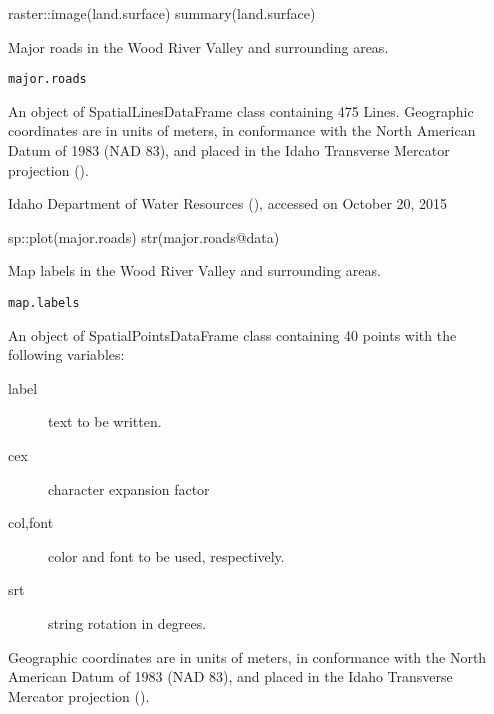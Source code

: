 \documentclass[a4paper]{book}
\begin{document}
%
\begin{Examples}
\begin{ExampleCode}
raster::image(land.surface)
summary(land.surface)

\end{ExampleCode}
\end{Examples}
%
\begin{Description}\relax
Major roads in the Wood River Valley and surrounding areas.
\end{Description}
%
\begin{Usage}
\begin{verbatim}
major.roads
\end{verbatim}
\end{Usage}
%
\begin{Format}
An object of SpatialLinesDataFrame class containing 475 Lines.
Geographic coordinates are in units of meters, in conformance with the
North American Datum of 1983 (NAD 83), and placed in the
Idaho Transverse Mercator projection ().
\end{Format}
%
\begin{Source}\relax
Idaho Department of Water Resources
(),
accessed on October 20, 2015
\end{Source}
%
\begin{Examples}
\begin{ExampleCode}
sp::plot(major.roads)
str(major.roads@data)

\end{ExampleCode}
\end{Examples}
%
\begin{Description}\relax
Map labels in the Wood River Valley and surrounding areas.
\end{Description}
%
\begin{Usage}
\begin{verbatim}
map.labels
\end{verbatim}
\end{Usage}
%
\begin{Format}
An object of SpatialPointsDataFrame class containing
40 points with the following variables:
\begin{description}

\item[label] text to be written.
\item[cex] character expansion factor
\item[col,font] color and font to be used, respectively.
\item[srt] string rotation in degrees.

\end{description}

Geographic coordinates are in units of meters, in conformance with the
North American Datum of 1983 (NAD 83), and placed in the
Idaho Transverse Mercator projection ().
\end{Format}
\end{document}
